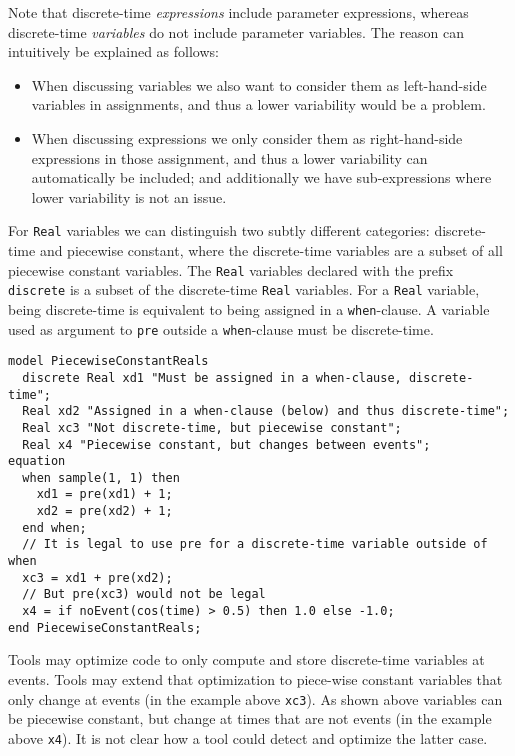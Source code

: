 \begin{nonnormative}
Note that discrete-time \emph{expressions} include parameter expressions, whereas discrete-time \emph{variables} do not include parameter variables.
The reason can intuitively be explained as follows:
\begin{itemize}
\item When discussing variables we also want to consider them as left-hand-side variables in assignments, and thus a lower variability would be a problem.
\item When discussing expressions we only consider them as right-hand-side expressions in those assignment, and thus a lower variability can automatically be included; and additionally we have sub-expressions where lower variability is not an issue.
\end{itemize}

For \lstinline!Real! variables we can distinguish two subtly different categories: discrete-time and piecewise constant, where the discrete-time variables are a subset of all piecewise constant variables.
The \lstinline!Real! variables declared with the prefix \lstinline!discrete! is a subset of the discrete-time \lstinline!Real! variables.
For a \lstinline!Real! variable, being discrete-time is equivalent to being assigned in a \lstinline!when!-clause.
A variable used as argument to \lstinline!pre! outside a \lstinline!when!-clause must be discrete-time.

\begin{lstlisting}[language=modelica]
model PiecewiseConstantReals
  discrete Real xd1 "Must be assigned in a when-clause, discrete-time";
  Real xd2 "Assigned in a when-clause (below) and thus discrete-time";
  Real xc3 "Not discrete-time, but piecewise constant";
  Real x4 "Piecewise constant, but changes between events";
equation
  when sample(1, 1) then
    xd1 = pre(xd1) + 1;
    xd2 = pre(xd2) + 1;
  end when;
  // It is legal to use pre for a discrete-time variable outside of when
  xc3 = xd1 + pre(xd2);
  // But pre(xc3) would not be legal
  x4 = if noEvent(cos(time) > 0.5) then 1.0 else -1.0;
end PiecewiseConstantReals;
\end{lstlisting}

Tools may optimize code to only compute and store discrete-time variables at events.
Tools may extend that optimization to piece-wise constant variables that only change at events (in the example above \lstinline!xc3!).
As shown above variables can be piecewise constant, but change at times that are not events (in the example above \lstinline!x4!).
It is not clear how a tool could detect and optimize the latter case.


\end{nonnormative}
